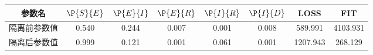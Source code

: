 \begin{tabular}{cccccccc}
\hline
参数名&$\P{S}{E}$&$\P{E}{I}$&$\P{E}{R}$&$\P{I}{R}$&$\P{I}{D}$&LOSS&FIT\\
\hline
隔离前参数值&0.540&0.244&0.007&0.001&0.008&589.991&4103.931\\
隔离后参数值&0.999&0.121&0.001&0.061&0.001&1207.943&268.129\\
\hline
\end{tabular}